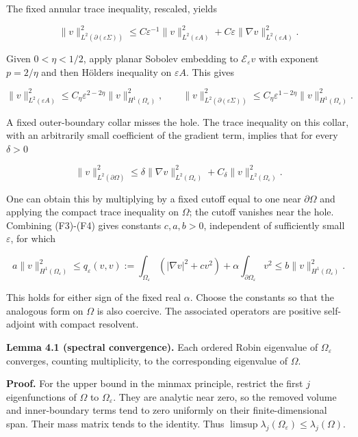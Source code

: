 \documentclass[11pt]{article}
\begin{document}
The fixed annular trace inequality, rescaled, yields

\[
 \|v\|_{L^2(\partial(\varepsilon\Sigma))}^2
 \le C\varepsilon^{-1}\|v\|_{L^2(\varepsilon A)}^2
        +C\varepsilon\|\nabla v\|_{L^2(\varepsilon A)}^2.
 \tag{F2}
\]

Given \(0<\eta<1/2\), apply planar Sobolev embedding to
\(\mathscr E_\varepsilon v\) with exponent \(p=2/\eta\) and then
Hölder\textquotesingle s inequality on \(\varepsilon A\). This gives

\[
 \|v\|_{L^2(\varepsilon A)}^2
    \le C_\eta\varepsilon^{2-2\eta}
                         \|v\|_{H^1(\Omega_\varepsilon)}^2,
 \qquad
 \|v\|_{L^2(\partial(\varepsilon\Sigma))}^2
    \le C_\eta\varepsilon^{1-2\eta}
                         \|v\|_{H^1(\Omega_\varepsilon)}^2.
 \tag{F3}
\]

A fixed outer-boundary collar misses the hole. The trace inequality on
this collar, with an arbitrarily small coefficient of the gradient term,
implies that for every \(\delta>0\)

\[
 \|v\|_{L^2(\partial\Omega)}^2
    \le\delta\|\nabla v\|_{L^2(\Omega_\varepsilon)}^2
       +C_\delta\|v\|_{L^2(\Omega_\varepsilon)}^2.
 \tag{F4}
\]

One can obtain this by multiplying by a fixed cutoff equal to one near
\(\partial\Omega\) and applying the compact trace inequality on
\(\Omega\); the cutoff vanishes near the hole. Combining (F3)-(F4) gives
constants \(c,a,b>0\), independent of sufficiently small
\(\varepsilon\), for which

\[
 a\|v\|_{H^1(\Omega_\varepsilon)}^2
 \le q_\varepsilon(v,v)
 :=\int_{\Omega_\varepsilon}(|\nabla v|^2+cv^2)
           +\alpha\int_{\partial\Omega_\varepsilon}v^2
 \le b\|v\|_{H^1(\Omega_\varepsilon)}^2.
 \tag{F5}
\]

This holds for either sign of the fixed real \(\alpha\). Choose the
constants so that the analogous form on \(\Omega\) is also coercive. The
associated operators are positive self-adjoint with compact resolvent.

\textbf{Lemma 4.1 (spectral convergence).} Each ordered Robin eigenvalue
of \(\Omega_\varepsilon\) converges, counting multiplicity, to the
corresponding eigenvalue of \(\Omega\).

\textbf{Proof.} For the upper bound in the minmax principle, restrict
the first \(j\) eigenfunctions of \(\Omega\) to \(\Omega_\varepsilon\).
They are analytic near zero, so the removed volume and inner-boundary
terms tend to zero uniformly on their finite-dimensional span. Their
mass matrix tends to the identity. Thus
\(\limsup\lambda_j(\Omega_\varepsilon)\le\lambda_j(\Omega)\).
\end{document}
